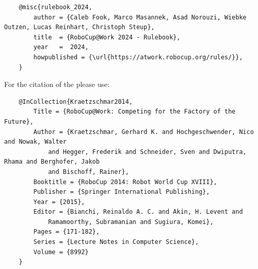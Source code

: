\begin{titlepage}
\begin{minipage}{\textwidth}
\begin{verbatim}
	@misc{rulebook_2024,
		author = {Caleb Fook, Marco Masannek, Asad Norouzi, Wiebke Outzen, Lucas Reinhart, Christoph Steup},
		title  = {RoboCup@Work 2024 - Rulebook},
		year   =  2024,
		howpublished = {\url{https://atwork.robocup.org/rules/}},
	}
\end{verbatim}


For the citation of the \RCAW please use:
\begin{verbatim}
	@InCollection{Kraetzschmar2014,
		Title = {RoboCup@Work: Competing for the Factory of the Future},
		Author = {Kraetzschmar, Gerhard K. and Hochgeschwender, Nico and Nowak, Walter
			and Hegger, Frederik and Schneider, Sven and Dwiputra, Rhama and Berghofer, Jakob
			and Bischoff, Rainer},
		Booktitle = {RoboCup 2014: Robot World Cup XVIII},
		Publisher = {Springer International Publishing},
		Year = {2015},
		Editor = {Bianchi, Reinaldo A. C. and Akin, H. Levent and
			Ramamoorthy, Subramanian and Sugiura, Komei},
		Pages = {171-182},
		Series = {Lecture Notes in Computer Science},
		Volume = {8992}
	}
\end{verbatim}
\end{minipage}




\end{titlepage}
